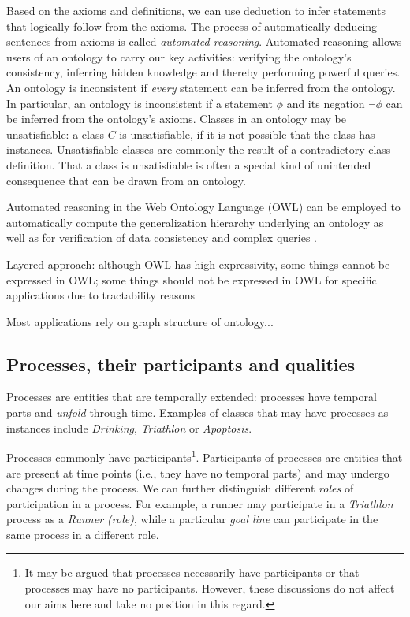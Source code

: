 \documentclass{bioinfo}
\renewcommand{\cite}{\citep}
\begin{document}
Based on the axioms and definitions, we can use deduction to infer
statements that logically follow from the axioms.  The process of
automatically deducing sentences from axioms is called {\em automated
  reasoning}. Automated reasoning allows users of an ontology to carry
our key activities: verifying the ontology's consistency, inferring
hidden knowledge and thereby performing powerful queries.  An ontology
is inconsistent if {\em every} statement can be inferred from the
ontology. In particular, an ontology is inconsistent if a statement
$\phi$ and its negation $\neg \phi$ can be inferred from the
ontology's axioms. Classes in an ontology may be unsatisfiable: a
class $C$ is unsatisfiable, if it is not possible that the class has
instances. Unsatisfiable classes are commonly the result of a
contradictory class definition. That a class is unsatisfiable is often
a special kind of unintended consequence that can be drawn from an
ontology.

Automated reasoning in the Web Ontology Language (OWL) can be employed
to automatically compute the generalization hierarchy underlying an
ontology as well as for verification of data consistency and complex
queries \cite{Hoehndorf2011incon, Hoehndorf2011models}.


Layered approach: although OWL has high expressivity, some things
cannot be expressed in OWL; some things should not be expressed in OWL
for specific applications due to tractability reasons

Most applications rely on graph structure of ontology...

\subsection{Processes, their participants and qualities}
Processes are entities that are temporally extended: processes have
temporal parts and {\em unfold} through time. Examples of classes that
may have processes as instances include {\em Drinking}, {\em
  Triathlon} or {\em Apoptosis}.

Processes commonly have participants\footnote{It may be argued that
  processes necessarily have participants or that processes may have
  no participants. However, these discussions do not affect our aims
  here and take no position in this regard.}. Participants of
processes are entities that are present at time points (i.e., they
have no temporal parts) and may undergo changes during the process.
We can further distinguish different {\em roles} of participation in a
process. For example, a runner may participate in a {\em Triathlon}
process as a {\em Runner (role)}, while a particular {\em goal line}
can participate in the same process in a different role.
\end{document}
